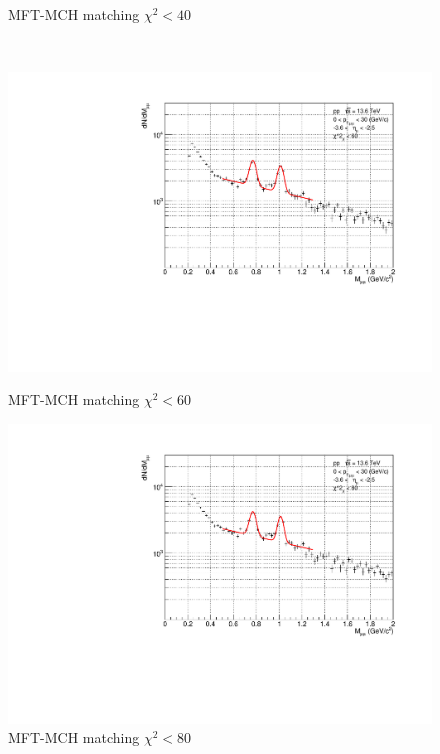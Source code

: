 \begin{figure}[H]
\begin{minipage}{0.45\textwidth}
                    \caption*{MFT-MCH matching $\chi^2 < 40$}
                \end{minipage}
                \\
                \vspace{1em}
                \begin{minipage}{0.45\textwidth}
                    \centering
                    \includegraphics[width=\textwidth]{fig/3_4_4_Fit_chi2_60.pdf}
                    \caption*{MFT-MCH matching $\chi^2 < 60$}
                \end{minipage}
                \hfill
                \begin{minipage}{0.45\textwidth}
                    \centering
                    \includegraphics[width=\textwidth]{fig/3_4_4_Fit_chi2_80.pdf}
                    \caption*{MFT-MCH matching $\chi^2 < 80$} 

\end{minipage}
\end{figure}
